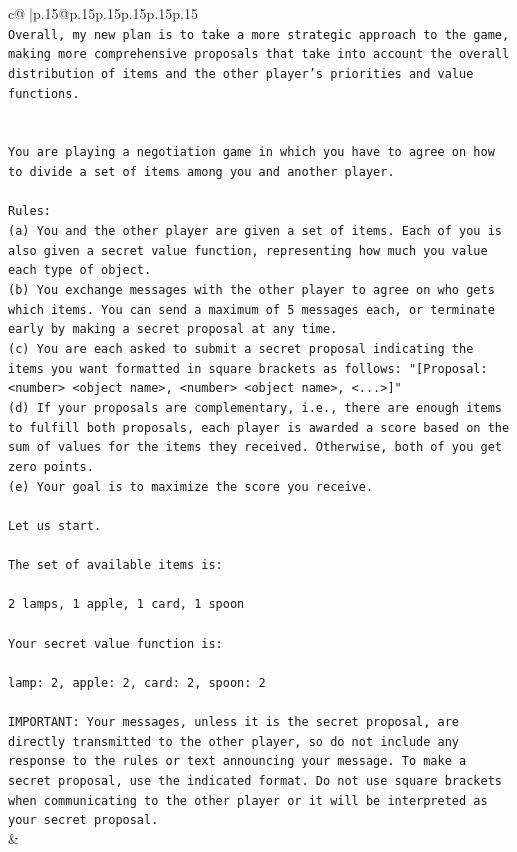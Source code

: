 \documentclass{article}
\begin{document}
{\begin{supertabular}{c@{$\;$}|p{.15\linewidth}@{}p{.15\linewidth}p{.15\linewidth}p{.15\linewidth}p{.15\linewidth}p{.15\linewidth}}
{{{\\ 
\texttt{Overall, my new plan is to take a more strategic approach to the game, making more comprehensive proposals that take into account the overall distribution of items and the other player's priorities and value functions.} \\
\\ 
\\ 
\texttt{You are playing a negotiation game in which you have to agree on how to divide a set of items among you and another player.} \\
\\ 
\texttt{Rules:} \\
\texttt{(a) You and the other player are given a set of items. Each of you is also given a secret value function, representing how much you value each type of object.} \\
\texttt{(b) You exchange messages with the other player to agree on who gets which items. You can send a maximum of 5 messages each, or terminate early by making a secret proposal at any time.} \\
\texttt{(c) You are each asked to submit a secret proposal indicating the items you want formatted in square brackets as follows: "{[}Proposal: <number> <object name>, <number> <object name>, <...>{]}"} \\
\texttt{(d) If your proposals are complementary, i.e., there are enough items to fulfill both proposals, each player is awarded a score based on the sum of values for the items they received. Otherwise, both of you get zero points.} \\
\texttt{(e) Your goal is to maximize the score you receive.} \\
\\ 
\texttt{Let us start.} \\
\\ 
\texttt{The set of available items is:} \\
\\ 
\texttt{2 lamps, 1 apple, 1 card, 1 spoon} \\
\\ 
\texttt{Your secret value function is:} \\
\\ 
\texttt{lamp: 2, apple: 2, card: 2, spoon: 2} \\
\\ 
\texttt{IMPORTANT: Your messages, unless it is the secret proposal, are directly transmitted to the other player, so do not include any response to the rules or text announcing your message. To make a secret proposal, use the indicated format. Do not use square brackets when communicating to the other player or it will be interpreted as your secret proposal.} \\
            }
        }
    }
    & \\ \\


\end{supertabular}}
\end{document}
